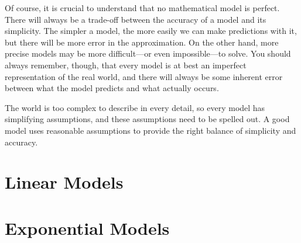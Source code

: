 \documentclass[9pt,letter,twoside,openright]{memoir}
\begin{document}
Of course, it is crucial to understand that no mathematical model is perfect.  There will always be a trade-off between the accuracy of a model and its simplicity.  The simpler a model, the more easily we can make predictions with it, but there will be more error in the approximation.  On the other hand, more precise models may be more difficult---or even impossible---to solve.  You should always remember, though, that every model is at best an imperfect representation of the real world, and there will always be some inherent error between what the model predicts and what actually occurs.

The world is too complex to describe in every detail, so every model has simplifying assumptions, and these assumptions need to be spelled out.  A good model uses reasonable assumptions to provide the right balance of simplicity and accuracy.
\vfill
\pagebreak

\section{Linear Models}


\section{Exponential Models}

\end{document}
